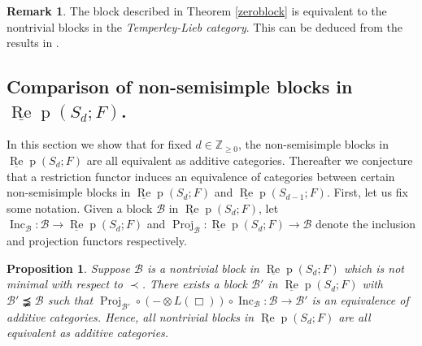 \documentclass{amsart}
\newtheorem{proposition}[theorem]{Proposition}
\theoremstyle{definition}
\newtheorem{remark}[theorem]{Remark}
\def\uRep{\underline{\operatorname{Re}}\!\operatorname{p}}
\newcommand{\Inc}{\operatorname{Inc}}
\newcommand{\Proj}{\operatorname{Proj}}
\renewcommand{\1}{_{(1)}}
\renewcommand{\2}{_{(2)}}
\newcommand{\3}{_{(3)}}
\newcommand{\4}{_{(4)}}
\newcommand{\Z}{\mathbb{Z}}
\newcommand{\cat}{\mathcal}
\begin{document}
\begin{remark} The block described in Theorem \ref{zeroblock} is equivalent to the nontrivial blocks in the 
{\em Temperley-Lieb category}. This can be deduced from the results in \cite[\S 10]{Wes}.
\end{remark}





\subsection{Comparison of non-semisimple blocks in $\uRep(S_d; F)$.}  In this section we show that for fixed $d\in\Z_{\geq0}$, the non-semisimple blocks in $\uRep(S_d; F)$ are all equivalent as additive categories.  Thereafter we conjecture that a restriction functor induces an equivalence of categories between certain non-semisimple blocks in $\uRep(S_d; F)$ and $\uRep(S_{d-1}; F)$.  
First, let us fix some notation.  Given a block $\cat{B}$ in $\uRep(S_d; F)$, let $\Inc_\cat{B}: \cat{B}\to\uRep(S_d; F)$ and $\Proj_\cat{B}: \uRep(S_d; F)\to\cat{B}$ denote the inclusion and projection functors respectively.  

\begin{proposition}\label{blocksfixd} Suppose $\cat{B}$ is a nontrivial block in $\uRep(S_d; F)$ which is not minimal with respect to $\prec$.  There exists a block $\cat{B}'$ in $\uRep(S_d; F)$ with $\cat{B}'\precneqq\cat{B}$ such that $\Proj_{\cat{B}'}\circ(-\otimes L(\Box))\circ\Inc_{\cat{B}}:\cat{B}\to\cat{B}'$ is an equivalence of additive categories.  Hence, all nontrivial blocks in $\uRep(S_d; F)$ are all equivalent as additive categories.
\end{proposition}
\end{document}
